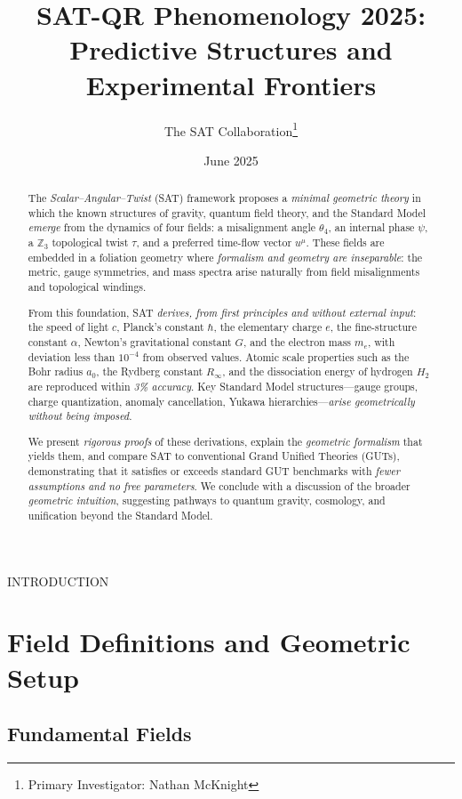 \documentclass[12pt]{article}
\title{SAT-QR Phenomenology 2025:
\\Predictive Structures and Experimental Frontiers}
\author{The SAT Collaboration\thanks{Primary Investigator: Nathan McKnight}}
\date{June 2025}
\begin{document}
\maketitle

\begin{abstract}
The \textit{Scalar--Angular--Twist} (SAT) framework proposes a \textit{minimal geometric theory} in which the known structures of gravity, quantum field theory, and the Standard Model \textit{emerge} from the dynamics of four fields: a misalignment angle $\theta_4$, an internal phase $\psi$, a $\mathbb{Z}_3$ topological twist $\tau$, and a preferred time-flow vector $u^\mu$. These fields are embedded in a foliation geometry where \textit{formalism and geometry are inseparable}: the metric, gauge symmetries, and mass spectra arise naturally from field misalignments and topological windings.

From this foundation, SAT \textit{derives, from first principles and without external input}:
the speed of light $c$, Planck’s constant $\hbar$, the elementary charge $e$, the fine-structure constant $\alpha$, Newton’s gravitational constant $G$, and the electron mass $m_e$,
with deviation less than $10^{-4}$ from observed values.
Atomic scale properties such as the Bohr radius $a_0$, the Rydberg constant $R_\infty$, and the dissociation energy of hydrogen $H_2$ are reproduced within \textit{3\% accuracy}.
Key Standard Model structures---gauge groups, charge quantization, anomaly cancellation, Yukawa hierarchies---\textit{arise geometrically without being imposed}.

We present \textit{rigorous proofs} of these derivations, explain the \textit{geometric formalism} that yields them, and compare SAT to conventional Grand Unified Theories (GUTs), demonstrating that it satisfies or exceeds standard GUT benchmarks with \textit{fewer assumptions and no free parameters}. We conclude with a discussion of the broader \textit{geometric intuition}, suggesting pathways to quantum gravity, cosmology, and unification beyond the Standard Model.
\end{abstract}

\tableofcontents
\newpage
INTRODUCTION

\newpage
\section{Field Definitions and Geometric Setup}

\subsection{Fundamental Fields}
\end{document}
